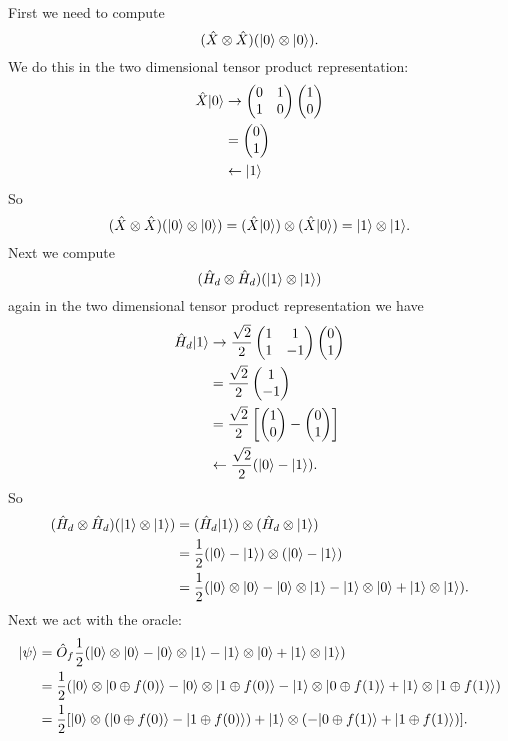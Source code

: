    First we need to compute
    \[(\hat{X}\otimes\hat{X})(\vert {0} \rangle\otimes\vert {0} \rangle).\]
    We do this in the two dimensional tensor product representation:
    \begin{align*}
        \hat{X}\vert {0} \rangle &\mathrel{\rightarrow} \begin{pmatrix} {0} & {1}\\ {1} & {0} \end{pmatrix}\begin{pmatrix} {1} \\ {0} \end{pmatrix}\\
        &= \begin{pmatrix} {0} \\ {1} \end{pmatrix}\\
        &\mathrel{\leftarrow} \vert {1} \rangle
    \end{align*}
    So
    \[(\hat{X}\otimes\hat{X})(\vert {0} \rangle\otimes\vert {0} \rangle) = (\hat{X}\vert {0} \rangle)\otimes(\hat{X}\vert {0} \rangle) = \vert {1} \rangle\otimes\vert {1} \rangle.\]
    Next we compute
    \[(\hat{H}_d\otimes\hat{H}_d)(\vert {1} \rangle\otimes\vert {1} \rangle)\]
    again in the two dimensional tensor product representation we have
    \begin{align*}
        \hat{H}_d\vert {1} \rangle &\mathrel{\rightarrow} \frac{\sqrt{2}}{2}\begin{pmatrix} {1} & {1}\\ {1} & {-1} \end{pmatrix}\begin{pmatrix} {0} \\ {1} \end{pmatrix}\\
        &= \frac{\sqrt{2}}{2}\begin{pmatrix} {1} \\ {-1} \end{pmatrix}\\
        &= \frac{\sqrt{2}}{2}\left[\begin{pmatrix} {1} \\ {0} \end{pmatrix} - \begin{pmatrix} {0} \\ {1} \end{pmatrix}\right]\\
        &\mathrel{\leftarrow} \frac{\sqrt{2}}{2}(\vert {0} \rangle - \vert {1} \rangle).
    \end{align*}
    So
    \begin{align*}
        (\hat{H}_d\otimes\hat{H}_d) (\vert {1} \rangle\otimes\vert {1} \rangle) &= (\hat{H}_d\vert {1} \rangle)\otimes (\hat{H}_d\otimes\vert {1} \rangle)\\
        &= \frac{1}{2}(\vert {0} \rangle - \vert {1} \rangle)\otimes(\vert {0} \rangle - \vert {1} \rangle)\\
        &= \frac{1}{2}(\vert {0} \rangle\otimes\vert {0} \rangle - \vert {0} \rangle\otimes\vert {1} \rangle - \vert {1} \rangle\otimes\vert {0} \rangle + \vert {1} \rangle\otimes\vert {1} \rangle).
    \end{align*}
    Next we act with the oracle:
    \begin{align*}
        \vert {\psi} \rangle &= \hat{O}_f \frac{1}{2}(\vert {0} \rangle\otimes\vert {0} \rangle - \vert {0} \rangle\otimes\vert {1} \rangle - \vert {1} \rangle\otimes\vert {0} \rangle + \vert {1} \rangle\otimes\vert {1} \rangle)\\
        &= \frac{1}{2}(\vert {0} \rangle\otimes\vert {0\oplus f(0)} \rangle - \vert {0} \rangle\otimes\vert {1\oplus f(0)} \rangle - \vert {1} \rangle\otimes\vert {0\oplus f(1)} \rangle + \vert {1} \rangle\otimes\vert {1\oplus f(1)} \rangle)\\
        &= \frac{1}{2}[\vert {0} \rangle\otimes(\vert {0\oplus f(0)} \rangle - \vert {1\oplus f(0)} \rangle) + \vert {1} \rangle\otimes (-\vert {0\oplus f(1)} \rangle + \vert {1\oplus f(1)} \rangle)].
    \end{align*}
